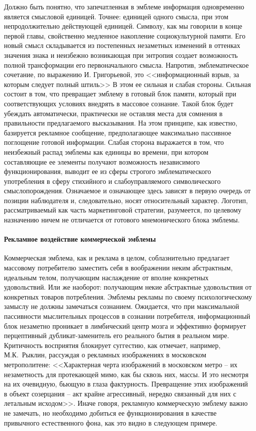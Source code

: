 Должно быть понятно, что запечатленная в эмблеме информация одновременно является смысловой
единицей. Точнее: единицей одного смысла, при этом непродолжительно действующей единицей.  Символу,
как мы говорили в конце первой главы, свойственно медленное накопление социокультурной памяти.  Его
новый смысл складывается из постепенных незаметных изменений в оттенках значения знака и неизбежно
возникающая при энтропия создает возможность полной трансформации его первоначального
смысла. Напротив, эмблематическое сочетание, по выражению И. Григорьевой, это <<информационный взрыв,
за которым следует полный штиль>> \autocite[][50]{grigoreva2005} В этом ее сильная и слабая стороны. Сильная
состоит в том, что превращает эмблему в готовый блок памяти, который при соответствующих условиях
внедрять в массовое сознание. Такой блок будет убеждать автоматически, практически не оставляя места
для сомнения в правильности предлагаемого высказывания. На этом принципе, как известно, базируется
рекламное сообщение, предполагающее максимально пассивное поглощение готовой информации.  Слабая
сторона выражается в том, что неизбежный распад эмблемы как единицы во времени, при котором
составляющие ее элементы получают возможность независимого функционирования, выводит ее из сферы
строгого эмблематического употребления в сферу стихийного и слабоуправляемого символического
смыслопорождения. Означаемое и означающее здесь зависят в первую очередь от позиции наблюдателя и,
следовательно, носят относительный характер. Логотип, рассматриваемый как часть маркетинговой
стратегии, разумеется, по целевому назначению ничем не отличается от готового мнемонического блока
эмблемы.

\paragraph{Рекламное воздействие коммерческой эмблемы}

Коммерческая эмблема, как и реклама в целом, соблазнительно предлагает массовому
потребителю заместить себя в воображении неким абстрактным, идеальным телом,
получающим наслаждение от вполне конкретных удовольствий. Или же наоборот:
получающим некие абстрактные удовольствия от конкретных товаров потребления.
Эмблемы рекламы по своему психологическому замыслу не должны замечаться сознанием.
Ожидается, что при максимальной пассивности мыслительных процессов в сознании
потребителя, информационный блок незаметно проникает в лимбический центр  мозга
и эффективно формирует перцептивный дубликат-заменитель его реального бытия в
реальном мире. Критичность восприятия блокирует суггестию, как отмечает, например,
М.К.~Рыклин, рассуждая о рекламных изображениях в московском метрополитене:
<<Характерная черта изображений в московском метро -- их незаметность для
протекающей мимо, как бы сквозь них, массы. И это несмотря на их очевидную,
бьющую в глаза фактурность. Превращение этих изображений в объект созерцания --
акт крайне агрессивный, нередко связанный для них с летальным
исходом>>.\autocite{рыклин1992тела}\autocite[][41]{ryklin1992}
Иначе говоря, рекламную коммерческую эмблему важно не замечать, но необходимо
добиться ее функционирования в качестве привычного естественного фона, как это
видно в следующем примере.


